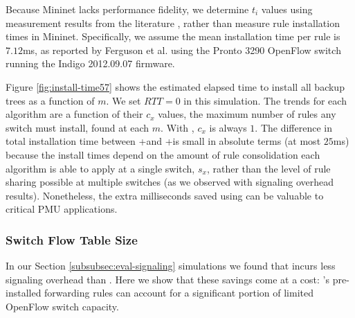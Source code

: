 Because Mininet lacks performance fidelity, we determine $t_i$ values using measurement results from the literature \cite{Ferguson13}, rather than measure rule installation times in Mininet.  
Specifically, we assume the mean installation time per rule is $7.12$ms, as reported by Ferguson et al. \cite{Ferguson13} using the Pronto 3290 OpenFlow switch running the Indigo 2012.09.07 firmware.

Figure \ref{fig:install-time57} shows the estimated elapsed time to install all backup trees as a function of $m$.  We set $RTT=0$ in this simulation.  The trends for each algorithm are a function 
of their $c_x$ values, the maximum number of rules any switch must install,  found at each $m$.  With \pres, $c_x$ is always $1$.  
The difference in total installation time between \posts+\base and \posts+\merge is small in absolute terms (at most $25$ms) because the install times depend on the amount of rule
consolidation each algorithm is able to apply at a single switch, $s_x$, rather than the level of rule sharing possible at multiple switches (as we observed with signaling overhead results).
Nonetheless, the extra milliseconds saved using \merge can be valuable to critical PMU applications.

\subsubsection{Switch Flow Table Size}
\label{subsubsec:eval-table-size}
In our Section \ref{subsubsec:eval-signaling} simulations we found that \pre incurs less signaling overhead than \posts. 
Here we show that these savings come at a cost: \pres's pre-installed forwarding rules can account for a significant portion of limited OpenFlow switch capacity.

